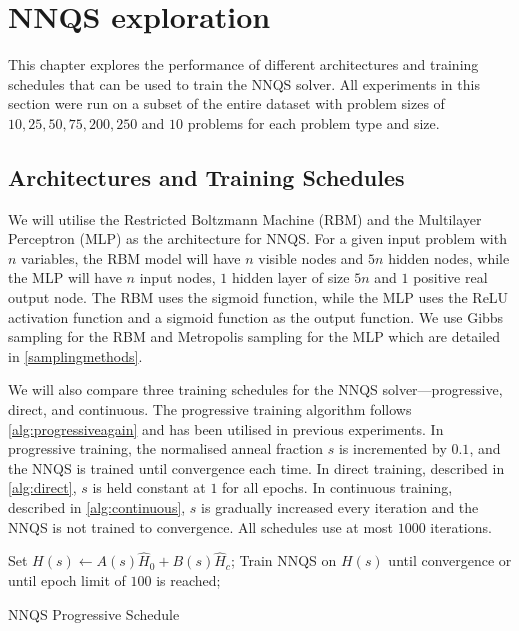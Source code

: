 \chapter{NNQS exploration}\label{nnqsresults}
This chapter explores the performance of different architectures and training schedules that can be used to train the NNQS solver. All experiments in this section were run on a subset of the entire dataset with problem sizes of $10,25,50,75,200,250$ and $10$ problems for each problem type and size. 


\section{Architectures and Training Schedules}
We will utilise the Restricted Boltzmann Machine (RBM) and the Multilayer Perceptron (MLP) as the architecture for NNQS. For a given input problem with $n$ variables, the RBM model will have $n$ visible nodes and $5n$ hidden nodes, while the MLP will have $n$ input nodes, $1$ hidden layer of size $5n$ and $1$ positive real output node. The RBM uses the sigmoid function, while the MLP uses the ReLU activation function and a sigmoid function as the output function. We use Gibbs sampling for the RBM and Metropolis sampling for the MLP which are detailed in \autoref{samplingmethods}.

We will also compare three training schedules for the NNQS solver---progressive, direct, and continuous. The progressive training algorithm follows \autoref{alg:progressiveagain} and has been utilised in previous experiments. In progressive training, the normalised anneal fraction $s$ is incremented by $0.1$, and the NNQS is trained until convergence each time. In direct training, described in \autoref{alg:direct}, $s$ is held constant at $1$ for all epochs. In continuous training, described in \autoref{alg:continuous}, $s$ is gradually increased every iteration and the NNQS is not trained to convergence. All schedules use at most $1000$ iterations.

\begin{algorithm}
    \begin{algorithmic}
    \State Set $H(s) \leftarrow A(s)\hat{H}_0 + B(s)\hat{H}_c$;
    \State Train NNQS on $H(s)$ until convergence or until epoch limit of $100$ is reached;
    \EndFor
    \end{algorithmic}
    \caption{NNQS Progressive Schedule}
    \label{alg:progressiveagain}
\end{algorithm}

